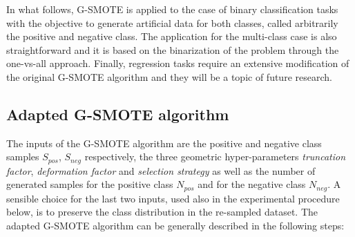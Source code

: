 \documentclass[parskip=full]{scrartcl}
\begin{document}
In what follows, G-SMOTE is applied to the case of binary classification tasks
with the objective to generate artificial data for both classes, called
arbitrarily the positive and negative class. The application for the multi-class
case is also straightforward and it is based on the binarization of the problem
through the one-vs-all approach. Finally, regression tasks require an extensive
modification of the original G-SMOTE algorithm and they will be a topic of
future research.

\subsection{Adapted G-SMOTE algorithm}

The inputs of the G-SMOTE algorithm are the positive and negative class samples
\( S_{pos} \), \( S_{neg} \) respectively, the three geometric hyper-parameters
\textit{truncation factor}, \textit{deformation factor} and \textit{selection
strategy} as well as the number of generated samples for the positive class
\(N_{pos} \) and for the negative class \( N_{neg} \). A sensible choice for the
last two inputs, used also in the experimental procedure below, is to preserve
the class distribution in the re-sampled dataset. The adapted G-SMOTE algorithm
can be generally described in the following steps:
\end{document}
